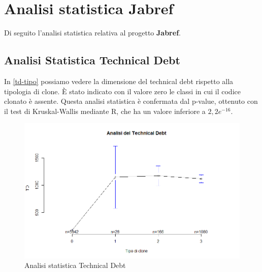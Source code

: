 \section{Analisi statistica Jabref}
Di seguito l'analisi statistica relativa al progetto \textbf{Jabref}.

\subsection{Analisi Statistica Technical Debt}
In \autoref{td-tipo} possiamo vedere la dimensione del technical debt rispetto alla tipologia di clone. È stato indicato con il valore zero le classi in cui il codice clonato è assente. Questa analisi statistica è confermata dal p-value, ottenuto con il test di Kruskal-Wallis mediante R, che ha un valore inferiore a $2,2 e^{-16}$.
\begin{figure}[htbp]
	\centering
	\includegraphics[scale=0.5]{analisi_R/AnalisiJabref/1-gplot-td-type.png}
\caption{Analisi statistica Technical Debt}
\label{td-tipo}
\end{figure}


